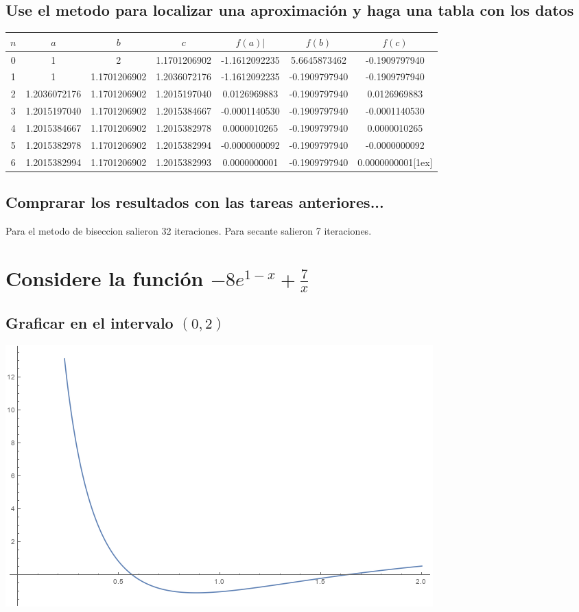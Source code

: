\documentclass{article}
\begin{document}
\subsection{Use el metodo para localizar una aproximación y haga una tabla con los datos}
\begin{center}
    \begin{tabular}{||c c c c c c c||} 
    \hline
    $n$ & $a$ & $b$  & $c$ & $f(a)|$ & $f(b)$ & $f(c)$ \\ [0.5ex] 
    \hline\hline
    0 & 1 & 2 & 1.1701206902 & -1.1612092235 & 5.6645873462 & -0.1909797940\\ 
    \hline
    1 & 1 & 1.1701206902  & 1.2036072176  & -1.1612092235 & -0.1909797940 & -0.1909797940 \\
    \hline
    2 & 1.2036072176 & 1.1701206902  & 1.2015197040   & 0.0126969883 & -0.1909797940 & 0.0126969883\\
    \hline
    3 & 1.2015197040  & 1.1701206902  & 1.2015384667& -0.0001140530 & -0.1909797940 & -0.0001140530\\
    \hline
    4 & 1.2015384667 & 1.1701206902  & 1.2015382978 & 0.0000010265 &-0.1909797940 & 0.0000010265\\
    \hline 
    5 & 1.2015382978 & 1.1701206902  & 1.2015382994& -0.0000000092 &-0.1909797940 & -0.0000000092\\
    \hline
    6 & 1.2015382994   & 1.1701206902  & 1.2015382993 &  0.0000000001  & -0.1909797940 & 0.0000000001[1ex]

   \end{tabular}
\end{center}

\subsection{Comprarar los resultados con las tareas anteriores...}
Para el metodo de biseccion salieron 32 iteraciones.
Para secante salieron 7 iteraciones.

\section{Considere la función $-8e^{1-x}+\frac{7}{x}$}
\subsection{Graficar en el intervalo $(0,2)$}
\includegraphics[scale=0.4]{graficaFalsa2.png}
\end{document}
